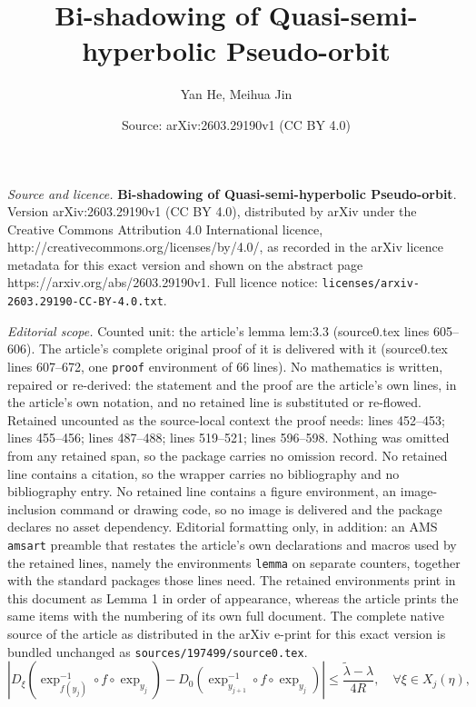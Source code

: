 \documentclass[10pt,a4paper]{amsart}
\title{\textbf{Bi-shadowing of Quasi-semi-hyperbolic Pseudo-orbit}}
\author{Yan He, Meihua Jin}
\date{Source: arXiv:2603.29190v1 (CC BY 4.0)}
\begin{document}
\maketitle

\noindent\emph{Source and licence.} \textbf{Bi-shadowing of Quasi-semi-hyperbolic Pseudo-orbit}. Version arXiv:2603.29190v1 (CC BY 4.0), distributed by arXiv under the Creative Commons Attribution 4.0 International licence, http://creativecommons.org/licenses/by/4.0/, as recorded in the arXiv licence metadata for this exact version and shown on the abstract page https://arxiv.org/abs/2603.29190v1. Full licence notice: \texttt{licenses/arxiv-2603.29190-CC-BY-4.0.txt}.\par\smallskip

\noindent\textit{Editorial scope.} Counted unit: the article's lemma lem:3.3 (source0.tex lines 605--606). The article's complete original proof of it is delivered with it (source0.tex lines 607--672, one \texttt{proof} environment of 66 lines). No mathematics is written, repaired or re-derived: the statement and the proof are the article's own lines, in the article's own notation, and no retained line is substituted or re-flowed.  Retained uncounted as the source-local context the proof needs: lines 452--453; lines 455--456; lines 487--488; lines 519--521; lines 596--598.  Nothing was omitted from any retained span, so the package carries no omission record.  No retained line contains a citation, so the wrapper carries no bibliography and no bibliography entry.  No retained line contains a figure environment, an image-inclusion command or drawing code, so no image is delivered and the package declares no asset dependency.  Editorial formatting only, in addition: an AMS \texttt{amsart} preamble that restates the article's own declarations and macros used by the retained lines, namely the environments \texttt{lemma} on separate counters, together with the standard packages those lines need.  The retained environments print in this document as Lemma 1 in order of appearance, whereas the article prints the same items with the numbering of its own full document.  The complete native source of the article as distributed in the arXiv e-print for this exact version is bundled unchanged as \texttt{sources/197499/source0.tex}.
	\begin{equation}\label{3.1}\left| D_\xi (\exp_{f(y_{j})}^{-1} \circ f \circ \exp_{y_j}) - D_0 (\exp_{y_{j+1}}^{-1} \circ f\circ \exp_{y_j}) \right| \leqslant \frac{\widetilde{\lambda} - \lambda}{4R}, \quad \forall \xi \in X_{j}(\eta),
	\end{equation}
\end{document}
